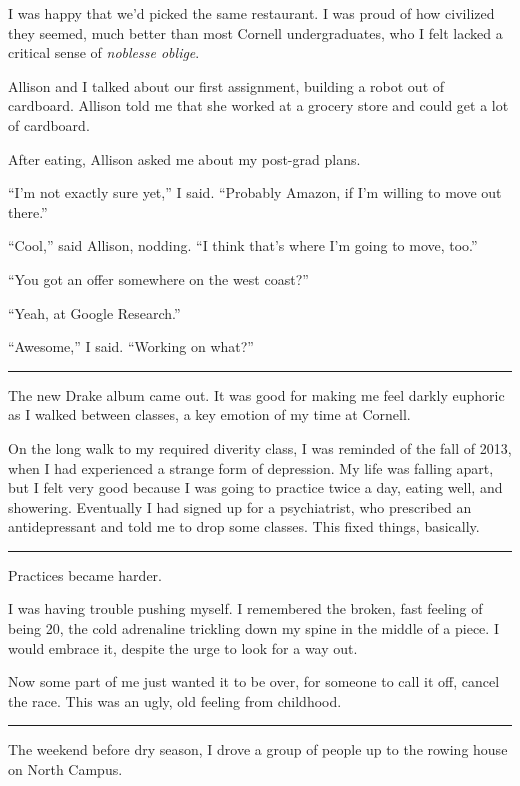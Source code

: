 I was happy that we'd picked the same restaurant.  I was proud of how civilized
they seemed, much better than most Cornell undergraduates, who I felt
lacked a critical sense of \textit{noblesse oblige}.

Allison and I talked about our first assignment, building a robot out of
cardboard.  Allison told me that she worked at a grocery store and could get a
lot of cardboard.  

After eating, Allison asked me about my post-grad plans.  

``I'm not exactly sure yet,'' I said.  ``Probably Amazon, if I'm willing to move
out there.''

``Cool,'' said Allison, nodding.  ``I think that's where I'm going to move,
too.''

``You got an offer somewhere on the west coast?''

``Yeah, at Google Research.''

``Awesome,'' I said.  ``Working on what?''

\plainfancybreak{12pt}{2}{}

The new Drake album came out.  It was good for making me feel darkly euphoric as
I walked between classes, a key emotion of my time at Cornell.  

On the long walk to my required diverity class, I was reminded of the fall of
2013, when I had experienced a strange form of depression.  My life was falling
apart, but I felt very good because I was going to practice twice a day, eating
well, and showering.  Eventually I had signed up for a psychiatrist, who
prescribed an antidepressant and told me to drop some classes.  This fixed
things, basically. 

\plainfancybreak{12pt}{2}{}

Practices became harder.

I was having trouble pushing myself.  I remembered the broken, fast feeling of
being 20, the cold adrenaline trickling down my spine in the middle of a piece.
I would embrace it, despite the urge to look for a way out.  

Now some part of me just wanted it to be over, for someone to call it off,
cancel the race.  This was an ugly, old feeling from childhood.

\plainfancybreak{12pt}{2}{}


The weekend before dry season, I drove a group of people up to the rowing house
on North Campus.

